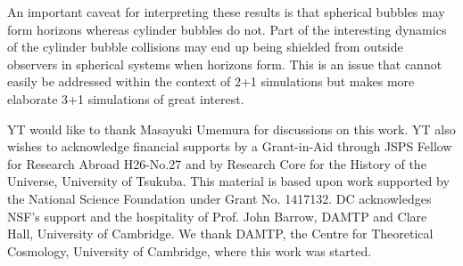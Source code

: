 \documentclass[preprintnumbers,eqsecnum,aps,prd,epsf,showpacs,nofootinbib
]{revtex4}
\begin{document}
An important caveat for interpreting these results is that spherical
bubbles may form horizons whereas cylinder bubbles do not. Part of the
interesting dynamics of the cylinder bubble collisions may end up
being shielded from outside observers in spherical systems when
horizons form. This is an issue that cannot easily be addressed within
the context of 2+1 simulations but makes more elaborate 3+1
simulations of great interest.

\acknowledgments
YT would like to thank Masayuki Umemura for discussions on this work. 
YT also wishes to acknowledge financial supports by a Grant-in-Aid through JSPS Fellow for Research Abroad H26-No.27 and by Research Core for the History of the Universe, University of Tsukuba. This material is based upon work supported by the National Science Foundation under Grant No. 1417132.
DC acknowledges NSF's support and the
hospitality of Prof. John Barrow, DAMTP and Clare Hall, University of Cambridge.
We thank DAMTP, the Centre for Theoretical Cosmology, University of Cambridge, where this work was started. 

\begin{thebibliography}{99}

\end{thebibliography}
\end{document}
